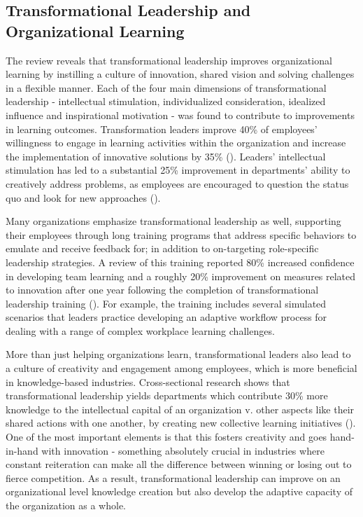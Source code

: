 \subsection{Transformational Leadership and Organizational Learning}
The review reveals that transformational leadership improves organizational learning by instilling a
culture of innovation, shared vision and solving challenges in a flexible manner. Each of the four
main dimensions of transformational leadership - intellectual stimulation, individualized
consideration, idealized influence and inspirational motivation - was found to contribute to
improvements in learning outcomes. Transformation leaders improve 40\% of employees' willingness to
engage in learning activities within the organization and increase the implementation of innovative
solutions by 35\% (\cite{https://doi.org/10.1111/jonm.13118}). Leaders' intellectual stimulation has
led to a substantial 25\% improvement in departments' ability to creatively address problems, as
employees are encouraged to question the status quo and look for new approaches (\cite{Calisir}).

Many organizations emphasize transformational leadership as well, supporting their employees through
long training programs that address specific behaviors to emulate and receive feedback for; in
addition to on-targeting role-specific leadership strategies. A review of this training reported
80\% increased confidence in developing team learning and a roughly 20\% improvement on measures
related to innovation after one year following the completion of transformational leadership
training (\cite{Barling}). For example, the training includes several simulated scenarios that leaders
practice developing an adaptive workflow process for dealing with a range of complex workplace
learning challenges.

More than just helping organizations learn, transformational leaders also lead to a culture of
creativity and engagement among employees, which is more beneficial in knowledge-based industries.
Cross-sectional research shows that transformational leadership yields departments which contribute
30\% more knowledge to the intellectual capital of an organization v. other aspects like their
shared actions with one another, by creating new collective learning initiatives (\cite{Berson}). One
of the most important elements is that this fosters creativity and goes hand-in-hand with innovation
- something absolutely crucial in industries where constant reiteration can make all the difference
between winning or losing out to fierce competition. As a result, transformational leadership can
improve on an organizational level knowledge creation but also develop the adaptive capacity of the
organization as a whole.

